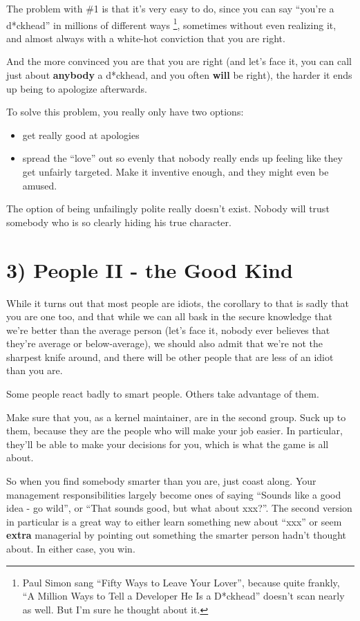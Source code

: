 \documentclass[a4paper,8pt,english]{sphinxmanual}
\begin{document}
The problem with \#1 is that it's very easy to do, since you can say
``you're a d*ckhead'' in millions of different ways \footnote[2]{
Paul Simon sang ``Fifty Ways to Leave Your Lover'', because quite
frankly, ``A Million Ways to Tell a Developer He Is a D*ckhead'' doesn't
scan nearly as well.  But I'm sure he thought about it.
}, sometimes without
even realizing it, and almost always with a white-hot conviction that
you are right.

And the more convinced you are that you are right (and let's face it,
you can call just about \textbf{anybody} a d*ckhead, and you often \textbf{will} be
right), the harder it ends up being to apologize afterwards.

To solve this problem, you really only have two options:
\begin{itemize}
\item {} 
get really good at apologies

\item {} 
spread the ``love'' out so evenly that nobody really ends up feeling
like they get unfairly targeted.  Make it inventive enough, and they
might even be amused.

\end{itemize}

The option of being unfailingly polite really doesn't exist. Nobody will
trust somebody who is so clearly hiding his true character.


\section{3) People II - the Good Kind}
\label{process/management-style:people-ii-the-good-kind}
While it turns out that most people are idiots, the corollary to that is
sadly that you are one too, and that while we can all bask in the secure
knowledge that we're better than the average person (let's face it,
nobody ever believes that they're average or below-average), we should
also admit that we're not the sharpest knife around, and there will be
other people that are less of an idiot than you are.

Some people react badly to smart people.  Others take advantage of them.

Make sure that you, as a kernel maintainer, are in the second group.
Suck up to them, because they are the people who will make your job
easier. In particular, they'll be able to make your decisions for you,
which is what the game is all about.

So when you find somebody smarter than you are, just coast along.  Your
management responsibilities largely become ones of saying ``Sounds like a
good idea - go wild'', or ``That sounds good, but what about xxx?''.  The
second version in particular is a great way to either learn something
new about ``xxx'' or seem \textbf{extra} managerial by pointing out something the
smarter person hadn't thought about.  In either case, you win.
\end{document}
